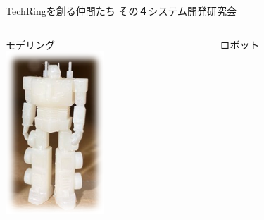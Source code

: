 \documentclass[dvipdfmx]{beamer}
\begin{document}
\begin{frame}{TechRingを創る仲間たち その４}{システム開発研究会}
  \begin{footnotesize}
    \begin{columns}[T,totalwidth=1.01\textwidth]
      \begin{column}{.20\textwidth}
        \begin{center}
          \alert{モデリング}\\
          \includegraphics[scale=0.5]{pic/shisuken1.png}
        \end{center}
      \end{column}
      \begin{column}{.20\textwidth}
        \begin{center}
          \alert{ロボット}\\

\end{center}
\end{column}
\end{columns}
\end{footnotesize}
\end{frame}
\end{document}
